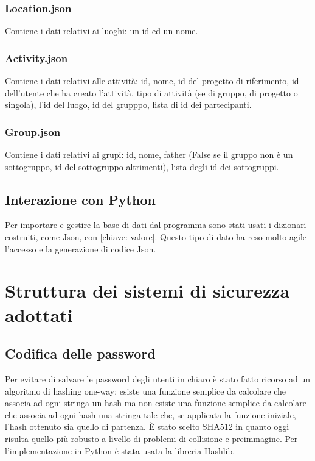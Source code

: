\documentclass[12pt]{scrartcl}
\begin{document}
    \subsubsection{Location.json}
        Contiene i dati relativi ai luoghi: un id ed un nome.
    
    \subsubsection{Activity.json}
        Contiene i dati relativi alle attivit\`a: id, nome, id del progetto di riferimento, 
        id dell'utente che ha creato l'attivit\`a, tipo di attivit\`a (se di gruppo, di progetto
        o singola), l'id del luogo, id del grupppo, lista di id dei partecipanti.
    
    \subsubsection{Group.json}
        Contiene i dati relativi ai grupi: id, nome, father (False se il gruppo non \`e un sottogruppo,
        id del sottogruppo altrimenti), lista degli id dei sottogruppi.
        
\subsection{Interazione con Python}
    Per importare e gestire la base di dati dal programma sono stati usati i dizionari costruiti,
    come Json, con [chiave: valore]. Questo tipo di dato ha reso molto agile
    l'accesso e la generazione di codice Json.


\section{Struttura dei sistemi di sicurezza adottati}
\subsection{Codifica delle password}
    Per evitare di salvare le password degli utenti in chiaro
    \`e stato fatto ricorso ad un algoritmo di hashing one-way:
    esiste una funzione semplice da calcolare che associa ad ogni stringa un hash
    ma non esiste una funzione semplice da calcolare che associa ad ogni hash una stringa
    tale che, se applicata la funzione iniziale, l'hash ottenuto sia quello di partenza.
    \`E stato scelto SHA512 in quanto oggi risulta quello pi\`u robusto a 
    livello di problemi di collisione e preimmagine. Per l'implementazione in Python
    \`e stata usata la libreria Hashlib.
\end{document}
